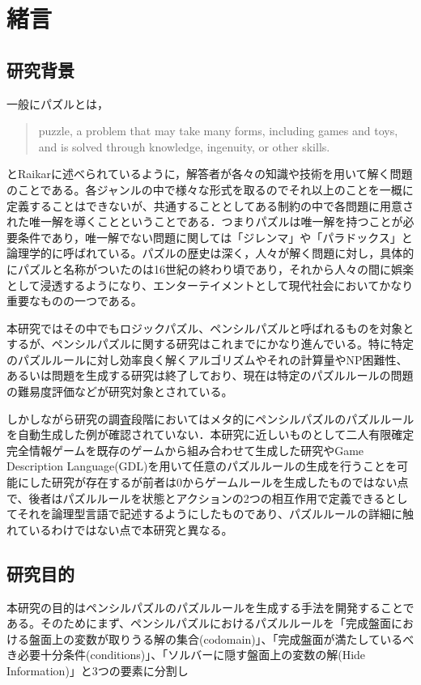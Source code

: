 \chapter{緒言}
\section{研究背景}
一般にパズルとは，
\begin{quote}
  puzzle, a problem that may take many forms, including games and toys, and is solved through knowledge, ingenuity, or other skills.
\end{quote}
とRaikar\cite{Raikar2022}に述べられているように，解答者が各々の知識や技術を用いて解く問題のことである。各ジャンルの中で様々な形式を取るのでそれ以上のことを一概に定義することはできないが、共通することとしてある制約の中で各問題に用意された唯一解を導くことということである．つまりパズルは唯一解を持つことが必要条件であり，唯一解でない問題に関しては「ジレンマ」や「パラドックス」と論理学的に呼ばれている\cite{wiki:puzzle}。パズルの歴史は深く，人々が解く問題に対し，具体的にパズルと名称がついたのは16世紀の終わり頃であり，それから人々の間に娯楽として浸透するようになり、エンターテイメントとして現代社会においてかなり重要なものの一つである。

本研究ではその中でもロジックパズル、ペンシルパズルと呼ばれるものを対象とするが、ペンシルパズルに関する研究はこれまでにかなり進んでいる。特に特定のパズルルールに対し効率良く解くアルゴリズムやそれの計算量やNP困難性、あるいは問題を生成する研究は終了しており、現在は特定のパズルルールの問題の難易度評価などが研究対象とされている。

しかしながら研究の調査段階においてはメタ的にペンシルパズルのパズルルールを自動生成した例が確認されていない．本研究に近しいものとして二人有限確定完全情報ゲームを既存のゲームから組み合わせて生成した研究やGame Description Language(GDL)を用いて任意のパズルルールの生成を行うことを可能にした研究が存在するが前者は0からゲームルールを生成したものではない点で、後者はパズルルールを状態とアクションの2つの相互作用で定義できるとしてそれを論理型言語で記述するようにしたものであり、パズルルールの詳細に触れているわけではない点で本研究と異なる。


\section{研究目的}
本研究の目的はペンシルパズルのパズルルールを生成する手法を開発することである。そのためにまず、ペンシルパズルにおけるパズルルールを「完成盤面における盤面上の変数が取りうる解の集合(codomain)」、「完成盤面が満たしているべき必要十分条件(conditions)」、「ソルバーに隠す盤面上の変数の解(Hide Information)」と3つの要素に分割し

